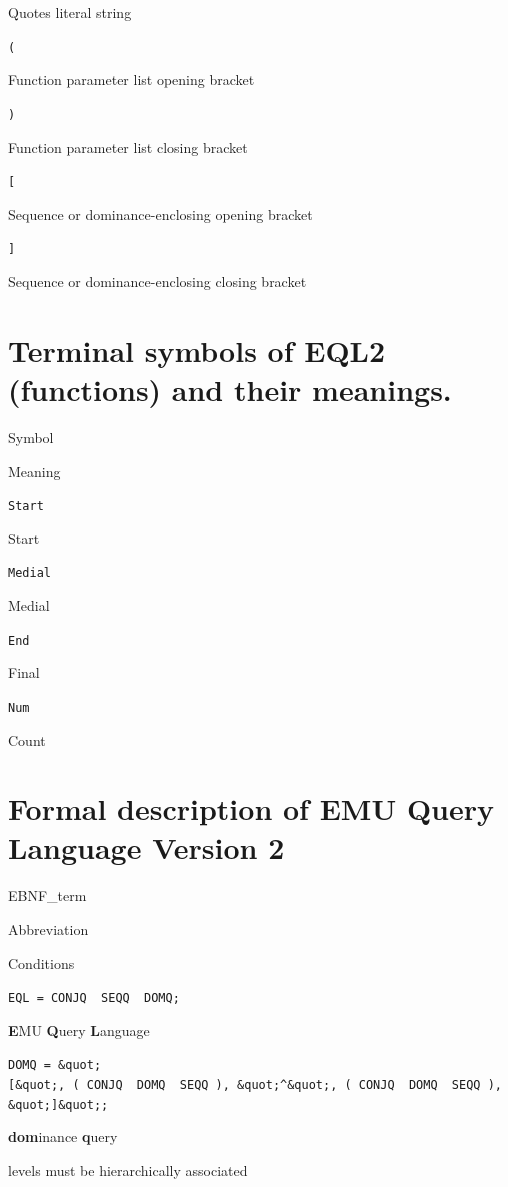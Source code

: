 \documentclass[]{book}
\theoremstyle{definition}
\theoremstyle{definition}
\theoremstyle{definition}
\theoremstyle{remark}
\begin{document}
Quotes literal string

\texttt{(}

Function parameter list opening bracket

\texttt{)}

Function parameter list closing bracket

\texttt{{[}}

Sequence or dominance-enclosing opening bracket

\texttt{{]}}

Sequence or dominance-enclosing closing bracket

\hypertarget{terminal-symbols-of-eql2-functions-and-their-meanings.}{%
\section{Terminal symbols of EQL2 (functions) and their
meanings.}\label{terminal-symbols-of-eql2-functions-and-their-meanings.}}

Symbol

Meaning

\texttt{Start}

Start

\texttt{Medial}

Medial

\texttt{End}

Final

\texttt{Num}

Count

\hypertarget{formal-description-of-emu-query-language-version-2}{%
\section{Formal description of EMU Query Language Version
2}\label{formal-description-of-emu-query-language-version-2}}

EBNF\_term

Abbreviation

Conditions

\texttt{EQL\ =\ CONJQ\ \textbar{}\ SEQQ\ \textbar{}\ DOMQ;}

\textbf{E}MU \textbf{Q}uery \textbf{L}anguage

\texttt{DOMQ\ =\ \&quot;{[}\&quot;,\ (\ CONJQ\ \textbar{}\ DOMQ\ \textbar{}\ SEQQ\ ),\ \&quot;\^{}\&quot;,\ (\ CONJQ\ \textbar{}\ DOMQ\ \textbar{}\ SEQQ\ ),\ \&quot;{]}\&quot;;}

\textbf{dom}inance \textbf{q}uery

levels must be hierarchically associated
\end{document}
